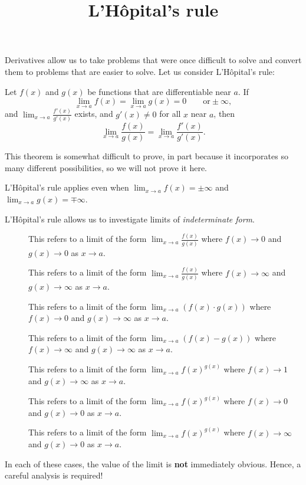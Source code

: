 \documentclass{ximera}
\title{L'H\^{o}pital's rule}
\begin{document}
\begin{abstract}

\end{abstract}
\maketitle

Derivatives allow us to take problems that were once difficult to
solve and convert them to problems that are easier to solve. Let us
consider L'H\^{o}pital's rule:

\begin{theorem} 
Let $f(x)$ and $g(x)$ be functions that are differentiable near $a$.  If
\[
\lim_{x \to a} f(x) = \lim_{x \to a}g(x) = 0 \qquad \text{or} \pm \infty,
\]
and $\lim_{x \to a} \frac{f'(x)}{g'(x)}$ exists, and $g'(x) \neq 0$
for all $x$ near $a$, then 
\[
\lim_{x \to a} \frac{f(x)}{g(x)} = \lim_{x \to a} \frac{f'(x)}{g'(x)}.
\]
\end{theorem}

This theorem is somewhat difficult to prove, in part because it
incorporates so many different possibilities, so we will not prove it
here. 
\begin{remark}
  L'H\^{o}pital's rule applies even when $\lim_{x\to a}f(x) = \pm \infty$
  and $\lim_{x\to a}g(x) = \mp \infty$.
\end{remark}


L'H\^{o}pital's rule allows us to investigate limits of
\textit{indeterminate form}.

\begin{definition}\hfil
\begin{description}
\item[\zeroOverZero] This refers to a limit of the form $\lim_{x\to a}
  \frac{f(x)}{g(x)}$ where $f(x)\to 0$ and $g(x)\to 0$ as $x\to a$.
\item[\inftyOverInfty] This refers to a limit of the form $\lim_{x\to a}
  \frac{f(x)}{g(x)}$ where $f(x)\to \infty$ and $g(x)\to \infty$ as $x\to a$.
\item[\zeroTimesInfty] This refers to a limit of the form $\lim_{x\to a}
  \left(f(x)\cdot g(x)\right)$ where $f(x)\to 0$ and $g(x)\to \infty$ as $x\to a$.
\item[\inftyMinusInfty] This refers to a limit of the form $\lim_{x\to a}\left(
  f(x)-g(x)\right)$ where $f(x)\to \infty$ and $g(x)\to \infty$ as $x\to a$.
\item[\oneToInfty] This refers to a limit of the form $\lim_{x\to a}
  f(x)^{g(x)}$ where $f(x)\to 1$ and $g(x)\to \infty$ as $x\to a$.
\item[\zeroToZero] This refers to a limit of the form $\lim_{x\to a}
  f(x)^{g(x)}$ where $f(x)\to 0$ and $g(x)\to 0$ as $x\to a$.
\item[\inftyToZero] This refers to a limit of the form $\lim_{x\to a}
  f(x)^{g(x)}$ where $f(x)\to \infty$ and $g(x)\to 0$ as $x\to a$.
\end{description}
In each of these cases, the value of the limit is \textbf{not} immediately
obvious. Hence, a careful analysis is required!
\end{definition}
\end{document}
